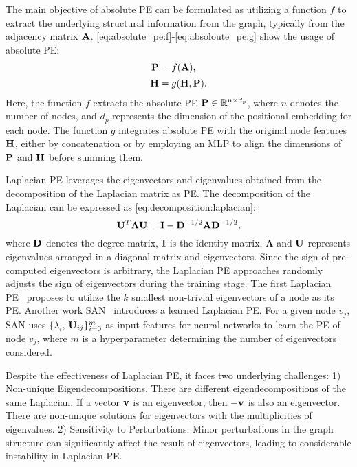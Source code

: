The main objective of absolute PE can be formulated as utilizing a function $f$ to
extract the underlying structural information from the graph, typically from the adjacency matrix $\mathbf{A}$. \cref{eq:absolute_pe:f}-\eqref{eq:absoloute_pe:g} show the usage of absolute PE:
\begin{align}
    \label{eq:absolute_pe:f}
    \mathbf{P} &= f(\mathbf{A}),\\
    \label{eq:absoloute_pe:g}
    \Tilde{\mathbf{H}} &= g(\mathbf{H}, \mathbf{P}).
\end{align}
Here, the function $f$ extracts the absolute PE $\mathbf{P} \in \mathbb{R}^{n\times d_p}$, where $n$ denotes the number of nodes, and $d_p$ represents the dimension of the positional embedding for each node. The function $g$ integrates absolute PE with the original node features $\mathbf{H}$, either by concatenation or by employing an MLP to align the dimensions of $\mathbf{P}$ and $\mathbf{H}$ before summing them.

Laplacian PE leverages the eigenvectors and eigenvalues obtained from the decomposition of the Laplacian matrix as PE. The decomposition of the Laplacian can be expressed as \cref{eq:decomposition:laplacian}:
\begin{equation}
    \label{eq:decomposition:laplacian}
    \mathbf{U}^{T} \mathbf{\Lambda} \mathbf{U}=\mathbf{I}-\mathbf{D}^{-1 / 2} \mathbf{A} \mathbf{D}^{-1 / 2},
\end{equation}
where $\mathbf{D}$ denotes the degree matrix, $\mathbf{I}$ is the identity matrix, $\mathbf{\Lambda}$ and $\mathbf{U}$ represents eigenvalues arranged in a diagonal matrix and eigenvectors. Since the sign of pre-computed eigenvectors is arbitrary, the Laplacian PE approaches randomly adjusts the sign of eigenvectors during the training stage. The first Laplacian PE~\cite{dwivedi2021generalization} proposes to utilize the $k$ smallest non-trivial eigenvectors of a node as its PE.
Another work SAN~\cite{kreuzer2021rethinking} introduces a learned Laplacian PE. For a given node $v_j$, SAN uses $\{\lambda_i$, $\mathbf{U}_{ij}\}_{i=0}^{m}$ as input features for neural networks to learn the PE of node $v_j$, where $m$ is a hyperparameter  determining the number of eigenvectors considered.

Despite the effectiveness of Laplacian PE, 
it faces two underlying challenges:
1) Non-unique Eigendecompositions.
There are different  eigendecompositions of the same Laplacian. If a vector $\mathbf{v}$ is an eigenvector, then $-\mathbf{v}$ is also an eigenvector. There are non-unique solutions for eigenvectors with the multiplicities of eigenvalues. 2) Sensitivity to Perturbations. Minor perturbations in the graph structure can significantly affect the result of eigenvectors, leading to  considerable instability in Laplacian PE.

